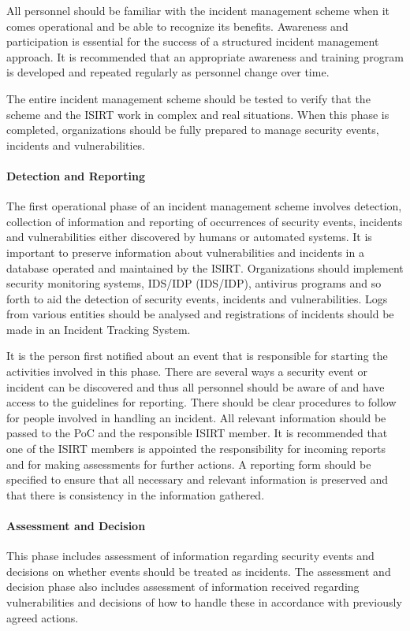 All personnel should be familiar with the incident management scheme when it comes operational and be able to recognize its benefits. Awareness and participation is essential for the success of a structured incident management approach. It is recommended that an appropriate awareness and training program is developed and repeated regularly as personnel change over time.

The entire incident management scheme should be tested to verify that the scheme and the \ac{ISIRT} work in complex and real situations. When this phase is completed, organizations should be fully prepared to manage security events, incidents and vulnerabilities.

\paragraph{Detection and Reporting} The first operational phase of an incident management scheme involves detection, collection of information and reporting of occurrences of security events, incidents and vulnerabilities either discovered by humans or automated systems. It is important to preserve information about vulnerabilities and incidents in a database operated and maintained by the \ac{ISIRT}. Organizations should implement security monitoring systems, \acl{IDS}/\acl{IDP} (\acs{IDS}/\acs{IDP}), antivirus programs and so forth to aid the detection of security events, incidents and vulnerabilities. Logs from various entities should be analysed and registrations of incidents should be made in an Incident Tracking System. 

It is the person first notified about an event that is responsible for starting the activities involved in this phase. There are several ways a security event or incident can be discovered and thus all personnel should be aware of and have access to the guidelines for reporting. There should be clear procedures to follow for people involved in handling an incident. All relevant information should be passed to the PoC and the responsible \ac{ISIRT} member. It is recommended that one of the \ac{ISIRT} members is appointed the responsibility for incoming reports and for making assessments for further actions.  A reporting form should be specified to ensure that all necessary and relevant information is preserved and that there is consistency in the information gathered. 

\paragraph{Assessment and Decision} This phase includes assessment of information regarding security events and decisions on whether events should be treated as incidents. The assessment and decision phase also includes assessment of information received regarding vulnerabilities and decisions of how to handle these in accordance with previously agreed actions.

